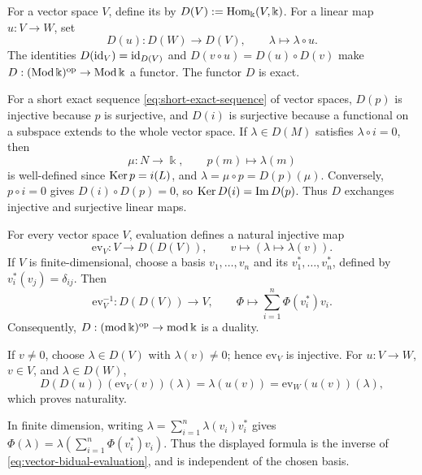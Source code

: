 \begin{example}\label{ex:linear-duality}
For a vector space $V$, define its  by $D(V):=\operatorname{Hom}\nolimits_\Bbbk(V,\Bbbk)$.
For a linear map $u:V\to W$, set
\[
D(u):D(W)\longrightarrow D(V),\qquad \lambda\longmapsto\lambda\circ u.
\]
The identities $D(\operatorname{id}_V)=\operatorname{id}_{D(V)}$ and $D(v\circ u)=D(u)\circ D(v)$ make $D:(\operatorname{\mathrm{Mod}}\Bbbk)^{\mathrm{op}}\to\operatorname{\mathrm{Mod}}\Bbbk$ a functor.
The functor $D$ is exact.
\begin{supplementary}[nobreak=true]
For a short exact sequence \eqref{eq:short-exact-sequence} of vector spaces, $D(p)$ is injective because $p$ is surjective, and $D(i)$ is surjective because a functional on a subspace extends to the whole vector space.
If $\lambda\in D(M)$ satisfies $\lambda\circ i=0$, then
\[
\mu:N\longrightarrow\Bbbk,\qquad p(m)\longmapsto\lambda(m)
\]
is well-defined since $\operatorname{Ker}\nolimits p=i(L)$, and $\lambda=\mu\circ p=D(p)(\mu)$.
Conversely, $p\circ i=0$ gives $D(i)\circ D(p)=0$, so $\operatorname{Ker}\nolimits D(i)=\operatorname{Im}\nolimits D(p)$.
Thus $D$ exchanges injective and surjective linear maps.
\end{supplementary}

For every vector space $V$, evaluation defines a natural injective map
\begin{equation}\label{eq:vector-bidual-evaluation}
\mathrm{ev}_V:V\longrightarrow D(D(V)),\qquad
v\longmapsto(\lambda\mapsto\lambda(v)).
\end{equation}
\label{not:dual-basis}
If $V$ is finite-dimensional, choose a basis $v_1,\ldots,v_n$ and its  $v_1^*,\ldots,v_n^*$, defined by $v_i^*(v_j)=\delta_{ij}$.
Then
\[
\mathrm{ev}_V^{-1}:D(D(V))\longrightarrow V,\qquad
\Phi\longmapsto\sum_{i=1}^n\Phi(v_i^*)v_i.
\]
Consequently, $D:(\operatorname{\mathrm{mod}}\Bbbk)^{\mathrm{op}}\to\operatorname{\mathrm{mod}}\Bbbk$ is a duality.
\begin{supplementary}
If $v\neq0$, choose $\lambda\in D(V)$ with $\lambda(v)\neq0$; hence $\mathrm{ev}_V$ is injective.
For $u:V\to W$, $v\in V$, and $\lambda\in D(W)$,
\[
D(D(u))(\mathrm{ev}_V(v))(\lambda)=\lambda(u(v))
=\mathrm{ev}_W(u(v))(\lambda),
\]
which proves naturality.
\begin{sloppypar}
In finite dimension, writing $\lambda=\sum_{i=1}^n\lambda(v_i)v_i^*$ gives
$\Phi(\lambda)=\lambda(\sum_{i=1}^n\Phi(v_i^*)v_i)$.
Thus the displayed formula is the inverse of \eqref{eq:vector-bidual-evaluation}, and is independent of the chosen basis.
\end{sloppypar}
\end{supplementary}
\end{example}

